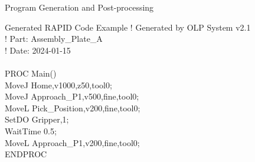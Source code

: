 \documentclass[10pt,aspectratio=169]{beamer}
\begin{document}
\begin{frame}{Program Generation and Post-processing}
\vspace{0.5cm}
\begin{exampleblock}{Generated RAPID Code Example}
\ttfamily
! Generated by OLP System v2.1\\
! Part: Assembly\_Plate\_A\\
! Date: 2024-01-15\\
\\
PROC Main()\\
\quad MoveJ Home,v1000,z50,tool0;\\
\quad MoveJ Approach\_P1,v500,fine,tool0;\\
\quad MoveL Pick\_Position,v200,fine,tool0;\\
\quad SetDO Gripper,1;\\
\quad WaitTime 0.5;\\
\quad MoveL Approach\_P1,v200,fine,tool0;\\
ENDPROC
\end{exampleblock}
\end{frame}
\end{document}
